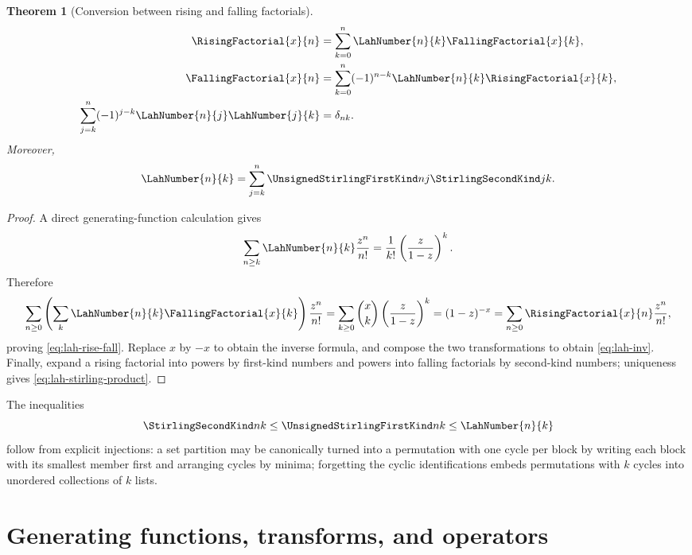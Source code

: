\documentclass[11pt,a4paper,oneside,openany]{book}
\newtheorem{theorem}{Theorem}[chapter]
\theoremstyle{definition}
\theoremstyle{remark}
\begin{document}
\begin{theorem}[Conversion between rising and falling factorials]\label{thm:lah-conv}
\begin{align}
 \RisingFactorial{x}{n}&=\sum_{k=0}^n\LahNumber{n}{k}\FallingFactorial{x}{k},\label{eq:lah-rise-fall}\\
 \FallingFactorial{x}{n}&=\sum_{k=0}^n(-1)^{n-k}\LahNumber{n}{k}\RisingFactorial{x}{k},\label{eq:lah-fall-rise}\\
 \sum_{j=k}^n(-1)^{j-k}\LahNumber{n}{j}\LahNumber{j}{k}&=\delta_{nk}.\label{eq:lah-inv}
\end{align}
Moreover,
\begin{equation}\label{eq:lah-stirling-product}
 \LahNumber{n}{k}=\sum_{j=k}^n\UnsignedStirlingFirstKind nj\StirlingSecondKind jk.
\end{equation}
\end{theorem}
\begin{proof}
A direct generating-function calculation gives
\[
 \sum_{n\ge k}\LahNumber{n}{k}\frac{z^n}{n!}
 =\frac1{k!}\left(\frac{z}{1-z}\right)^k.
\]
Therefore
\[
 \sum_{n\ge0}\left(\sum_k\LahNumber{n}{k}\FallingFactorial{x}{k}\right)\frac{z^n}{n!}
 =\sum_{k\ge0}\binom{x}{k}\left(\frac{z}{1-z}\right)^k
 =(1-z)^{-x}
 =\sum_{n\ge0}\RisingFactorial{x}{n}\frac{z^n}{n!},
\]
proving \cref{eq:lah-rise-fall}.  Replace $x$ by $-x$ to obtain the inverse formula,
and compose the two transformations to obtain \cref{eq:lah-inv}.  Finally, expand a
rising factorial into powers by first-kind numbers and powers into falling factorials
by second-kind numbers; uniqueness gives \cref{eq:lah-stirling-product}.
\end{proof}

The inequalities
\begin{equation}\label{eq:stirling-lah-ineq}
 \StirlingSecondKind nk\le\UnsignedStirlingFirstKind nk\le \LahNumber{n}{k}
\end{equation}
follow from explicit injections: a set partition may be canonically turned into a
permutation with one cycle per block by writing each block with its smallest member
first and arranging cycles by minima; forgetting the cyclic identifications embeds
permutations with $k$ cycles into unordered collections of $k$ lists.


\chapter{Generating functions, transforms, and operators}
\label{ch:stirling-gf}
\end{document}
